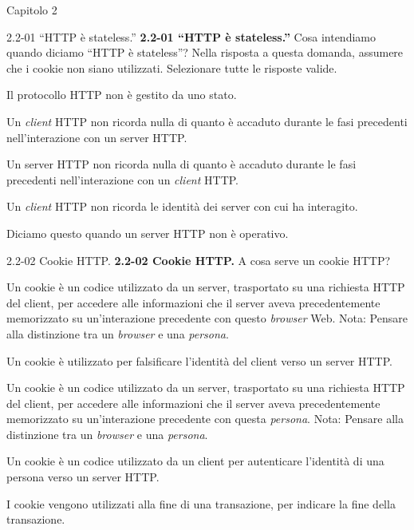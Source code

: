 \documentclass[a4paper]{article}
\begin{document}
\begin{quiz}{Capitolo 2}
\begin{multi}[points=1,shuffle,multiple]{2.2-01 ``HTTP è stateless.''}
\textbf{2.2-01 ``HTTP è stateless.''} Cosa intendiamo quando diciamo ``HTTP è stateless''? Nella risposta a questa domanda, assumere che i cookie non siano utilizzati. Selezionare tutte le risposte valide.
\item Il protocollo HTTP non è gestito da uno stato.
\item Un \emph{client} HTTP non ricorda nulla di quanto è accaduto durante le fasi precedenti nell'interazione con un server HTTP.
\item* Un server HTTP non ricorda nulla di quanto è accaduto durante le fasi precedenti nell'interazione con un \emph{client} HTTP.
\item Un \emph{client} HTTP non ricorda le identità dei server con cui ha interagito.
\item Diciamo questo quando un server HTTP non è operativo.
\end{multi}

\begin{multi}[points=1,shuffle]{2.2-02 Cookie HTTP.}
\textbf{2.2-02 Cookie HTTP.} A cosa serve un cookie HTTP?
\item* Un cookie è un codice utilizzato da un server, trasportato su una richiesta HTTP del client, per accedere alle informazioni che il server aveva precedentemente memorizzato su un'interazione precedente con questo \emph{browser} Web. Nota: Pensare alla distinzione tra un \emph{browser} e una \emph{persona}.
\item Un cookie è utilizzato per falsificare l'identità del client verso un server HTTP.
\item Un cookie è un codice utilizzato da un server, trasportato su una richiesta HTTP del client, per accedere alle informazioni che il server aveva precedentemente memorizzato su un'interazione precedente con questa \emph{persona}. Nota: Pensare alla distinzione tra un \emph{browser} e una \emph{persona}.
\item Un cookie è un codice utilizzato da un client per autenticare l'identità di una persona verso un server HTTP.
\item I cookie vengono utilizzati alla fine di una transazione, per indicare la fine della transazione.
\end{multi}
            

\end{quiz}
\end{document}
